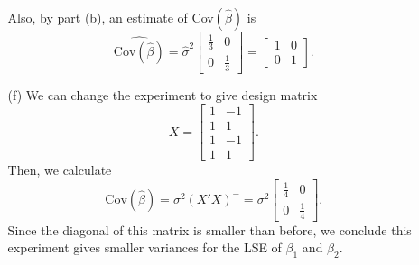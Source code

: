 \documentclass[11pt]{article}
\begin{document}
\begin{itemize}
\begin{itemize}
\[\]
Also, by part (b), an estimate of Cov$(\widehat{\beta})$ is
\[
\widehat{\text{Cov}(\widehat{\beta})} = \widehat{\sigma}^2\begin{bmatrix}
\frac{1}{3} & 0 \\
0 & \frac{1}{3}
\end{bmatrix} = \begin{bmatrix}
1 & 0 \\
0 & 1
\end{bmatrix}.
\]
\item[(f)]  We can change the experiment to give design matrix
\[
X = \begin{bmatrix}
1 & -1 \\
1 & 1 \\
1 & -1 \\
1 & 1
\end{bmatrix}.
\]
Then, we calculate
\[
\text{Cov}(\widehat{\beta}) = \sigma^2(X'X)^- = \sigma^2\begin{bmatrix}
\frac{1}{4} & 0 \\
0 & \frac{1}{4}
\end{bmatrix}.
\]
Since the diagonal of this matrix is smaller than before, we conclude this experiment gives smaller variances for the LSE of $\beta_1$ and $\beta_2$.
\end{itemize}
\end{itemize}
\end{document}

